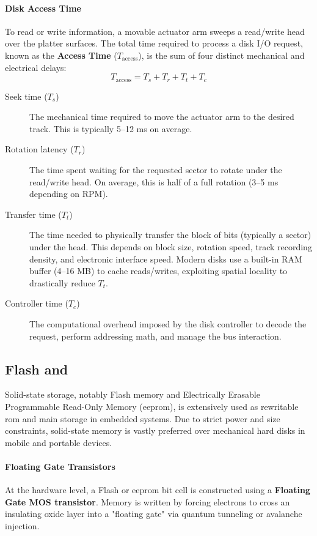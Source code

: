 \paragraph{Disk Access Time}
To read or write information, a movable actuator arm sweeps a read/write head over the platter surfaces. The total time required to process a disk I/O request, known as the \textbf{Access Time} ($T_{\text{access}}$), is the sum of four distinct mechanical and electrical delays:
\[T_{\text{access}} = T_s + T_r + T_t + T_c\]

\begin{description}
    \item[Seek time ($T_s$)] The mechanical time required to move the actuator arm to the desired track. This is typically 5--12 ms on average.
    \item[Rotation latency ($T_r$)] The time spent waiting for the requested sector to rotate under the read/write head. On average, this is half of a full rotation (3--5 ms depending on RPM).
    \item[Transfer time ($T_t$)] The time needed to physically transfer the block of bits (typically a sector) under the head. This depends on block size, rotation speed, track recording density, and electronic interface speed. Modern disks use a built-in RAM buffer (4--16 MB) to cache reads/writes, exploiting spatial locality to drastically reduce $T_t$.
    \item[Controller time ($T_c$)] The computational overhead imposed by the disk controller to decode the request, perform addressing math, and manage the bus interaction.
\end{description}


\subsection{Flash  and }
Solid-state storage, notably Flash memory and Electrically Erasable Programmable Read-Only Memory (\gls{eeprom}), is extensively used as rewritable \gls{rom} and main storage in embedded systems. Due to strict power and size constraints, solid-state memory is vastly preferred over mechanical hard disks in mobile and portable devices.

\paragraph{Floating Gate Transistors}
At the hardware level, a Flash or \gls{eeprom} bit cell is constructed using a \textbf{Floating Gate MOS transistor}. Memory is written by forcing electrons to cross an insulating oxide layer into a "floating gate" via quantum tunneling or avalanche injection. 

